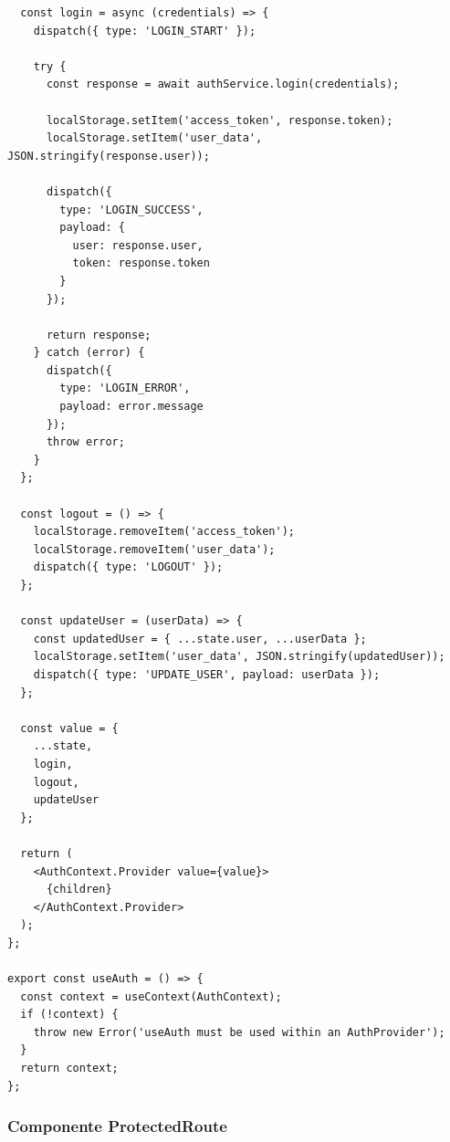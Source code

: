 \documentclass[12pt,a4paper,oneside]{report}
\begin{document}
\begin{lstlisting}
  const login = async (credentials) => {
    dispatch({ type: 'LOGIN_START' });
    
    try {
      const response = await authService.login(credentials);
      
      localStorage.setItem('access_token', response.token);
      localStorage.setItem('user_data', JSON.stringify(response.user));
      
      dispatch({
        type: 'LOGIN_SUCCESS',
        payload: {
          user: response.user,
          token: response.token
        }
      });
      
      return response;
    } catch (error) {
      dispatch({
        type: 'LOGIN_ERROR',
        payload: error.message
      });
      throw error;
    }
  };

  const logout = () => {
    localStorage.removeItem('access_token');
    localStorage.removeItem('user_data');
    dispatch({ type: 'LOGOUT' });
  };

  const updateUser = (userData) => {
    const updatedUser = { ...state.user, ...userData };
    localStorage.setItem('user_data', JSON.stringify(updatedUser));
    dispatch({ type: 'UPDATE_USER', payload: userData });
  };

  const value = {
    ...state,
    login,
    logout,
    updateUser
  };

  return (
    <AuthContext.Provider value={value}>
      {children}
    </AuthContext.Provider>
  );
};

export const useAuth = () => {
  const context = useContext(AuthContext);
  if (!context) {
    throw new Error('useAuth must be used within an AuthProvider');
  }
  return context;
};
\end{lstlisting}

\subsubsection{Componente
ProtectedRoute}\label{componente-protectedroute}
\end{document}
